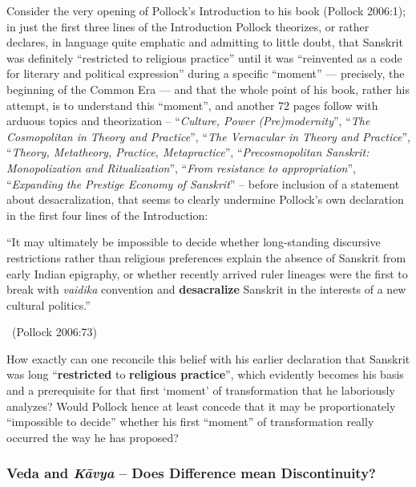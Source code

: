 Consider the very opening of Pollock’s Introduction to his book (Pollock 2006:1); in just the first three lines of the Introduction Pollock theorizes, or rather declares, in language quite emphatic and admitting to little doubt, that Sanskrit was definitely “restricted to religious practice” until it was “reinvented as a code for literary and political expression” during a specific “moment” — precisely, the beginning of the Common Era — and that the whole point of his book, rather his attempt, is to understand this “moment”, and another 72 pages follow with arduous topics and theorization – “\textit{Culture, Power (Pre)modernity}”, “\textit{The Cosmopolitan in Theory and Practice}”, “\textit{The Vernacular in Theory and Practice}”, “\textit{Theory, Metatheory, Practice, Metapractice}”, “\textit{Precosmopolitan Sanskrit: Monopolization and Ritualization}”, “\textit{From resistance to appropriation}”, “\textit{Expanding the Prestige Economy of Sanskrit}” – before inclusion of a statement about desacralization, that seems to clearly undermine Pollock’s own declaration in the first four lines of the Introduction:

\begin{myquote}
“It may ultimately be impossible to decide whether long-standing discursive restrictions rather than religious preferences explain the absence of Sanskrit from early Indian epigraphy, or whether recently arrived ruler lineages were the first to break with \textit{vaidika} convention and \textbf{desacralize} Sanskrit in the interests of a new cultural politics.” 

~\hfill (Pollock 2006:73)
\end{myquote}

\newpage

How exactly can one reconcile this belief with his earlier declaration that Sanskrit was long “\textbf{restricted} to \textbf{religious practice}”, which evidently becomes his basis and a prerequisite for that first ‘moment’ of transformation that he laboriously analyzes? Would Pollock hence at least concede that it may be proportionately “impossible to decide” whether his first “moment” of transformation really occurred the way he has proposed?

\vspace{-.4cm}

\subsubsection{Veda and \textit{Kāvya} – Does Difference mean Discontinuity?}

